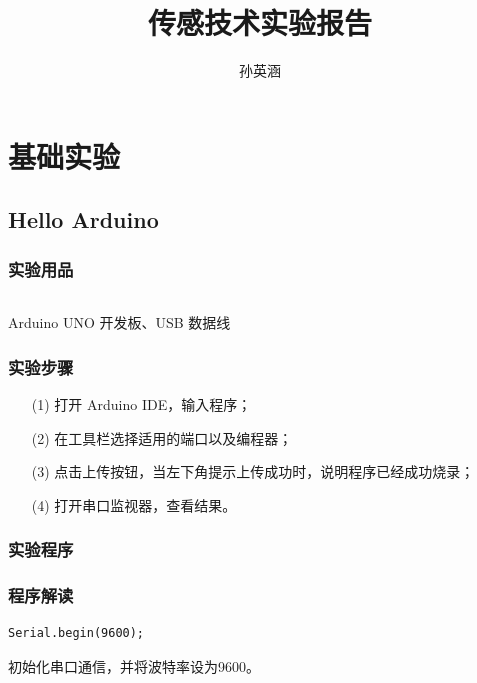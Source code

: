 \documentclass[UTF8, oneside]{ctexbook}
\begin{document}
\title{传感技术实验报告}
\author{孙英涵}

\frontmatter

\maketitle

\tableofcontents

\mainmatter

\part{基础实验}

\chapter{Hello Arduino}

\section{实验用品}
\paragraph{}
Arduino UNO 开发板、USB 数据线

\section{实验步骤}
\begin{itemize}
    \item[(1)] 打开 Arduino IDE，输入程序；
    \item[(2)] 在工具栏选择适用的端口以及编程器；
    \item[(3)] 点击上传按钮，当左下角提示上传成功时，说明程序已经成功烧录；
    \item[(4)] 打开串口监视器，查看结果。   
\end{itemize}

\section{实验程序}


\section{程序解读}

\begin{lstlisting}[style=CPP]
Serial.begin(9600);
\end{lstlisting}
初始化串口通信，并将波特率设为9600。
\end{document}
